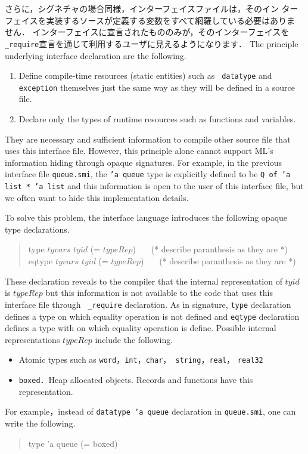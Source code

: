 \documentclass{jbook}
\newenvironment{program}{\begin{tt}\begin{quote}}{\end{quote}\end{tt}}
\begin{document}
	さらに，シグネチャの場合同様，インターフェイスファイルは，そのイン
ターフェイスを実装するソースが定義する変数をすべて網羅している必要はありま
せん．
	インターフェイスに宣言されたもののみが，そのインターフェイスを{\tt
\_require}宣言を通じて利用するユーザに見えるようになります．
\else%
	The principle underlying interface declaration are the
following.
\begin{enumerate}
\item 
	Define compile-time resources (static entities) such as {\tt
datatype} and {\tt exception} themselves just the same way as they will
be defined in a source file.
\item 
	Declare only the types of runtime resources such as functions
and variables.
\end{enumerate}
	They are necessary and sufficient information to compile other
source file that uses this interface file.
	However, this principle alone cannot support ML's information
hiding through opaque signatures.
	For example, in the previous interface file {\tt queue.smi},
the {\tt 'a queue} type is explicitly defined to be {\tt Q of 'a list *
'a list} and this information is open to the user of this interface
file, but we often want to hide this implementation details.

	To solve this problem, the interface language introduces the
following opaque type declarations.
\begin{program}
type $tyvars$ $tyid$ (= $typeRep$) \ \ \ 
(* describe paranthesis as they are *)\\
eqtype $tyvars$ $tyid$ (= $typeRep$) \ \ \
(* describe paranthesis as they are *)
\end{program}
	These declaration reveals to the compiler that the internal
representation of $tyid$ is $typeRep$ but this information is not
available to the code that uses this interface file through {\tt
\_require} declaration.
	As in signature, {\tt type} declaration defines a type on which 
equality operation is not defined and {\tt eqtype} declaration defines a
type with on which  equality operation is define.
 	Possible internal representations $typeRep$ include the
following.
\begin{itemize}
\item Atomic types such as {\tt word}，{\tt int}，{\tt char}，{\tt
string}，{\tt real}， {\tt real32}
\item {\tt boxed}．Heap allocated objects. 
	Records and functions have this representation.
\end{itemize}
	For example，instead of {\tt datatype 'a queue} declaration in
{\tt queue.smi}, one can write the following.
\begin{program}
type 'a queue (= boxed)
\end{program}
\end{document}
